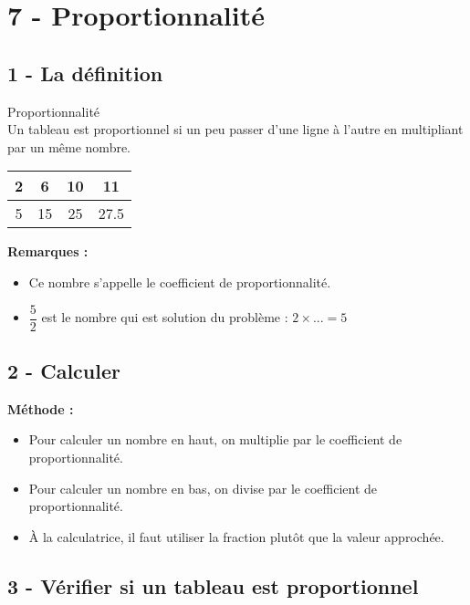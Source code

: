 



\section*{7 - Proportionnalité}

\subsection*{1 - La définition}

\begin{Definition}{Proportionnalité}\\
  Un tableau est proportionnel si un peu passer d'une ligne à l'autre en multipliant par un même nombre.
\end{Definition}

\begin{center} \begin{tabular}{|c|c|c|c|} 
  2 &  6 & 10 & 11   \\ \hline
  5 & 15 & 25 & 27.5 \\ \hline 
 \end{tabular}\end{center}

\textbf{Remarques : }
\begin{itemize}[label={$\bullet$}]
  \item Ce nombre s'appelle le coefficient de proportionnalité.
  \item $\dfrac{5}{2}$ est le nombre qui est solution du problème : $2 \times ... = 5$
\end{itemize}  

\subsection*{2 - Calculer}

\textbf{Méthode : }
\begin{itemize}[label={$\bullet$}]
  \item Pour calculer un nombre en haut, on multiplie par le coefficient de proportionnalité. 
  \item Pour calculer un nombre en bas, on divise par le coefficient de proportionnalité. 
  \item À la calculatrice, il faut utiliser la fraction plutôt que la valeur approchée. 
\end{itemize}  


\subsection*{3 - Vérifier si un tableau est proportionnel}

